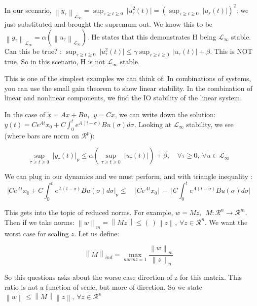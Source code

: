 \documentclass[11pt]{article}
\newcommand{\norm}[1]{\left\lVert#1\right\rVert}
\begin{document}
In our scenario, $\norm{y_\tau}_{\mathcal{L}_\infty}  = \sup_{\tau \geq t \geq 0} \ \rvert u_\tau ^2(t)\rvert = (\sup_{\tau \geq t \geq 0} \ \rvert u_\tau(t)\rvert)^2$; we just substituted and brought the supremum out. We know this to be $\norm{y_\tau}_{\mathcal{L}_\infty} =\alpha(\norm{u_\tau}_{\mathcal{L}_\infty}) $. He states that this demonstrates H being $\mathcal{L}_\infty$ stable. Can this be true? : $\sup_{\tau \geq t \geq 0} \ \rvert u_\tau ^2 (t)\rvert \leq \gamma \sup_{\tau \geq t \geq 0} \ \rvert u_\tau(t) \rvert + \beta$. This is NOT true. So in this scenario, H is not $\mathcal{L}_\infty$ stable.

This is one of the simplest examples we can think of. In combinations of systems, you can use the small gain theorem to show linear stability. In the combination of linear and nonlinear components, we find the IO stability of the linear system.

In the case of $\dot{x} = Ax + Bu, \ \ y= Cx$, we can write down the solution: $y(t) = Ce^{At}x_0 + C \int_0^t e^{A(t-\sigma)} Bu(\sigma)d\sigma$. Looking at $\mathcal{L}_\infty$ stability, we see (where bars are norm on $\mathcal{R}^p$):

\begin{equation}
	\sup_{\tau \geq t \geq 0} \ \rvert y_\tau(t) \rvert_p \leq \alpha (\sup_{\tau \geq t \geq 0} \ \rvert u_\tau(t) \rvert) + \beta, \quad \forall \tau \geq 0, \ \forall u \in \mathcal{L}_\infty
\end{equation}

We can plug in our dynamics and we must perform, and with triangle inequality :
\begin{equation}
	\rvert Ce^{At}x_0 + C \int_0^t e^{A(t-\sigma)} Bu(\sigma)d\sigma \rvert_p \leq \quad \rvert Ce^{At}x_0  \rvert \ + \ \rvert  C \int_0^t e^{A(t-\sigma)}Bu(\sigma)d\sigma \rvert
\end{equation}

This gets into the topic of reduced norms.  For example, $w = Mz,\ \ M:\mathcal{R}^n \rightarrow \mathcal{R}^m$. Then if we take norms: $\norm{w}_m = \norm{Mz} \leq ( \ )  \norm{z}, \ \forall z \in \mathcal{R}^n$. We want the worst case for scaling $z$.  Let us define:

\begin{equation}
 \norm{M}_{ind} = \max_{norm{z}=1} \frac{\norm{w}_m}{\norm{z}_n}
\end{equation}

So this questions asks about the worse case direction of z for this matrix. This ratio is not a function of scale, but more of direction. So we state $\norm{w} \leq \norm{M} \norm{z}, \ \forall z \in  \mathcal{R}^n$
\end{document}
